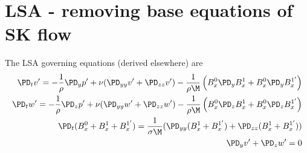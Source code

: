 \documentclass[11pt]{article}
\begin{document}
\doublespacing
\MOONSTITLE
\maketitle

\section{LSA - removing base equations of SK flow}

The LSA governing equations (derived elsewhere) are
\begin{equation}\begin{aligned}
\PD_t v' = -\frac{1}{\rho}\PD_y p' + \nu (\PD_{yy} v'+\PD_{zz} v') - \frac{1}{\rho \M} \left( B_x^0 \PD_y B_x^1 + B_x^0 \PD_y B_x^{1'} \right) \\
\PD_t w' = -\frac{1}{\rho}\PD_z p' + \nu (\PD_{yy} w'+\PD_{zz} w') - \frac{1}{\rho \M} \left( B_x^0 \PD_z B_x^1 + B_x^0 \PD_z B_x^{1'} \right) \\
\PD_t (B_x^{0}+B_x^{1}+B_x^{1'}) = \frac{1}{\sigma \M} (\PD_{yy} (B_x^{1}+B_x^{1'})+\PD_{zz} (B_x^{1}+B_x^{1'})) \\
\PD_y v' + \PD_z w' = 0  \\
\end{aligned} \end{equation}
\end{document}
